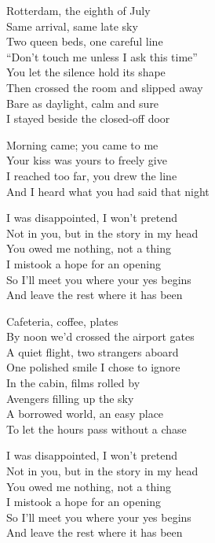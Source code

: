 \begin{lyrics}
Rotterdam, the eighth of July\\
Same arrival, same late sky\\
Two queen beds, one careful line\\
“Don’t touch me unless I ask this time”\\
You let the silence hold its shape\\
Then crossed the room and slipped away\\
Bare as daylight, calm and sure\\
I stayed beside the closed-off door

Morning came; you came to me\\
Your kiss was yours to freely give\\
I reached too far, you drew the line\\
And I heard what you had said that night

I was disappointed, I won’t pretend\\
Not in you, but in the story in my head\\
You owed me nothing, not a thing\\
I mistook a hope for an opening\\
So I’ll meet you where your yes begins\\
And leave the rest where it has been

Cafeteria, coffee, plates\\
By noon we’d crossed the airport gates\\
A quiet flight, two strangers aboard\\
One polished smile I chose to ignore\\
In the cabin, films rolled by\\
Avengers filling up the sky\\
A borrowed world, an easy place\\
To let the hours pass without a chase

I was disappointed, I won’t pretend\\
Not in you, but in the story in my head\\
You owed me nothing, not a thing\\
I mistook a hope for an opening\\
So I’ll meet you where your yes begins\\
And leave the rest where it has been


\end{lyrics}
